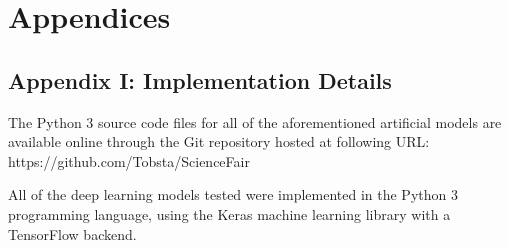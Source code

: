 \documentclass[]{report}
\begin{document}
\section{Appendices}

\subsection{Appendix I: Implementation Details}

The Python 3 source code files for all of the aforementioned artificial models are available online through the Git repository hosted at following URL: https://github.com/Tobsta/ScienceFair

All of the deep learning models tested were implemented in the Python 3 programming language, using the Keras machine learning library with a TensorFlow backend.

\twocolumn
\end{document}
